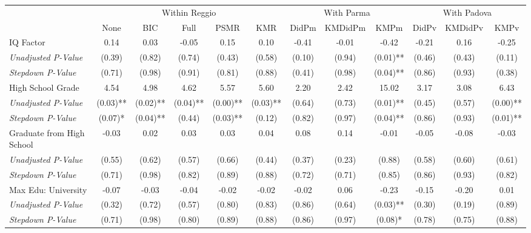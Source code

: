 \begin{tabular}{l c c c c c c c c c c c}
\toprule
& \multicolumn{5}{c}{Within Reggio} & \multicolumn{3}{c}{With Parma} & \multicolumn{3}{c}{With Padova} \\\cmidrule(lr){2-6} \cmidrule(lr){7-9} \cmidrule(lr){10-12}
 & None & BIC & Full & PSMR & KMR & DidPm & KMDidPm & KMPm & DidPv & KMDidPv & KMPv \\
\midrule
IQ Factor & 0.14 & 0.03 & -0.05 & 0.15 & 0.10 & -0.41 & -0.01 & -0.42 & -0.21 & 0.16 & -0.25 \\
\quad \textit{Unadjusted P-Value} & (0.39) & (0.82) & (0.74) & (0.43) & (0.58) & (0.10) & (0.94) & (0.01)** & (0.46) & (0.43) & (0.11) \\
\quad \textit{Stepdown P-Value} & (0.71) & (0.98) & (0.91) & (0.81) & (0.88) & (0.41) & (0.98) & (0.04)** & (0.86) & (0.93) & (0.38) \\
High School Grade & 4.54 & 4.98 & 4.62 & 5.57 & 5.60 & 2.20 & 2.42 & 15.02 & 3.17 & 3.08 & 6.43 \\
\quad \textit{Unadjusted P-Value} & (0.03)** & (0.02)** & (0.04)** & (0.00)** & (0.03)** & (0.64) & (0.73) & (0.01)** & (0.45) & (0.57) & (0.00)** \\
\quad \textit{Stepdown P-Value} & (0.07)* & (0.04)** & (0.44) & (0.03)** & (0.12) & (0.82) & (0.97) & (0.04)** & (0.86) & (0.93) & (0.01)** \\
Graduate from High School & -0.03 & 0.02 & 0.03 & 0.03 & 0.04 & 0.08 & 0.14 & -0.01 & -0.05 & -0.08 & -0.03 \\
\quad \textit{Unadjusted P-Value} & (0.55) & (0.62) & (0.57) & (0.66) & (0.44) & (0.37) & (0.23) & (0.88) & (0.58) & (0.60) & (0.61) \\
\quad \textit{Stepdown P-Value} & (0.71) & (0.98) & (0.82) & (0.89) & (0.88) & (0.72) & (0.71) & (0.85) & (0.86) & (0.93) & (0.82) \\
Max Edu: University & -0.07 & -0.03 & -0.04 & -0.02 & -0.02 & -0.02 & 0.06 & -0.23 & -0.15 & -0.20 & 0.01 \\
\quad \textit{Unadjusted P-Value} & (0.32) & (0.72) & (0.57) & (0.80) & (0.83) & (0.86) & (0.64) & (0.03)** & (0.30) & (0.19) & (0.89) \\
\quad \textit{Stepdown P-Value} & (0.71) & (0.98) & (0.80) & (0.89) & (0.88) & (0.86) & (0.97) & (0.08)* & (0.78) & (0.75) & (0.88) \\
\bottomrule
\end{tabular}

